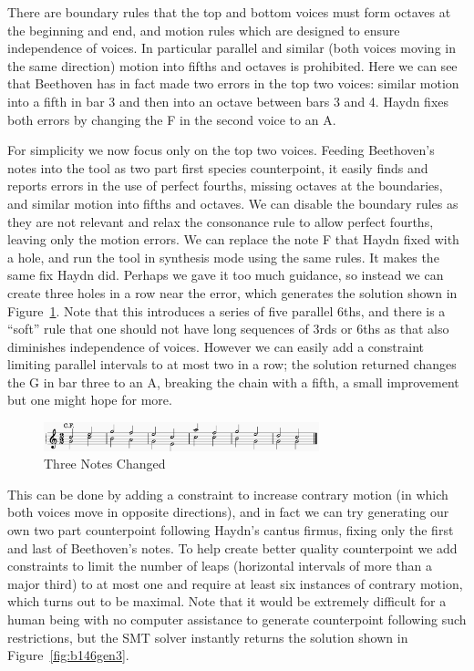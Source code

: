 \documentclass[sigplan,screen]{acmart}
\begin{document}
There are boundary rules that the top and bottom voices must form
octaves at the beginning and end, and motion rules which are designed
to ensure independence of voices. In particular parallel and similar
(both voices moving in the same direction) motion into fifths and
octaves is prohibited. Here we can see that Beethoven has in fact made
two errors in the top two voices: similar motion into a fifth in bar 3
and then into an octave between bars 3 and 4. Haydn fixes both errors
by changing the F in the second voice to an A.

For simplicity we now focus only on the top two voices. Feeding
Beethoven's notes into the tool as two part first species
counterpoint, it easily finds and reports errors in the use of perfect
fourths, missing octaves at the boundaries, and similar motion into
fifths and octaves. We can disable the boundary rules as they are not
relevant and relax the consonance rule to allow perfect fourths, leaving
only the motion errors. We can replace the note F that Haydn fixed
with a hole, and run the tool in synthesis mode using the same
rules. It makes the same fix Haydn did. Perhaps we gave it too much
guidance, so instead we can create three holes in a row near the
error, which generates the solution shown in
Figure~\ref{fig:b146fix3}. Note that this introduces a series of five
parallel 6ths, and there is a ``soft'' rule that one should not have
long sequences of 3rds or 6ths as that also diminishes independence
of voices. However we can easily add a constraint limiting parallel
intervals to at most two in a row; the solution returned changes the G
in bar three to an A, breaking the chain with a fifth, a small
improvement but one might hope for more.

\begin{figure}
  \includegraphics[width=8cm]{figures/b146fix3.png}
  \caption{Three Notes Changed}
  \label{fig:b146fix3}
\end{figure}

This can be done by adding a constraint to increase contrary motion
(in which both voices move in opposite directions), and in fact we can
try generating our own two part counterpoint following Haydn's cantus
firmus, fixing only the first and last of Beethoven's notes. To help
create better quality counterpoint we add constraints to limit the
number of leaps (horizontal intervals of more than a major third) to
at most one and require at least six instances of contrary motion,
which turns out to be maximal. Note that it would be extremely
difficult for a human being with no computer assistance to generate
counterpoint following such restrictions, but the SMT solver instantly
returns the solution shown in Figure~\ref{fig:b146gen3}.
\end{document}
